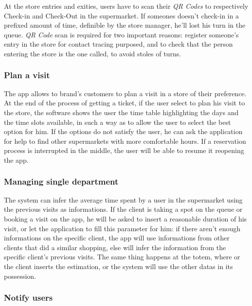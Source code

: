 \documentclass{article}
\begin{document}
		At the store entries and exities, users have to scan their \emph{QR Codes} to respectively Check-in and Check-Out in the supermarket. If someones doesn't check-in in a prefixed amount of time, definible by the store manager, he'll lost his turn in the queue. \emph{QR Code} scan is required for two important reasons: register someone's entry in the store for contact tracing purposed, and to check that the person entering the store is the one called, to avoid stoles of turns. \\
		
		\subsubsection{Plan a visit}
		
		The app allows to brand's customers to plan a visit in a store of their preference. At the end of the process of getting a ticket, if the user select to plan his visit to the store, the software shows the user the time table highlighting the days and the time slots available, in such a way as to allow the user to select the best option for him. If the options do not satisfy the user, he can ask the application for help to find other supermarkets with more comfortable hours. If a reservation process is interrupted in the middle, the user will be able to resume it reopening the app. \\
		
		\subsubsection{Managing single department}
		
		The system can infer the average time spent by a user in the supermarket using the previous visits as informations. If the client is taking a spot on the queue or booking a visit on the app, he will be asked to insert a reasonable duration of his visit, or let the application to fill this parameter for him: if there aren't enough informations on the specific client, the app will use informations from other clients that did a similar shopping, else will infer the information from the specific client's previous visits. The same thing happens at the totem, where or the client inserts the estimation, or the system will use the other datas in its possession. \\
		
		\subsubsection{Notify users}
		
\end{document}
